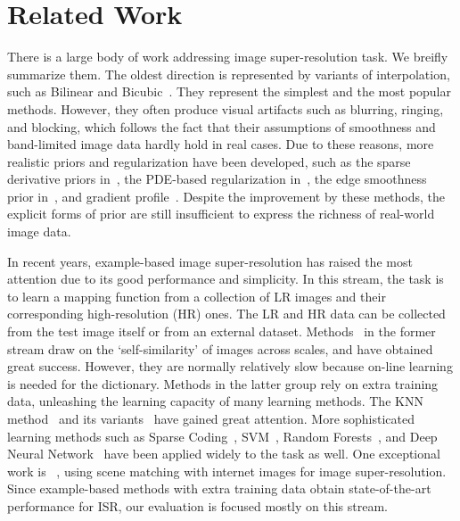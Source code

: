 \section{Related Work}
\label{sec:relatedwork}
There is a large body of work addressing image super-resolution
task. We breifly summarize them. %
The oldest direction is represented by variants of interpolation, such
as Bilinear and
Bicubic~\cite{Duchon-JAM-1979,Thevenaz-BOOK-2000}. They represent the
simplest and the most popular methods. However, they often produce
visual artifacts such as blurring, ringing, and blocking, which
follows the fact that their assumptions of smoothness and band-limited
image data hardly hold in real cases. Due to these reasons, more
realistic priors and regularization have been developed, such as the
sparse derivative priors in~\cite{Tappen-WSCTV-2003}, the PDE-based
regularization in~\cite{Tschumperle-PAMI-2005}, the edge
smoothness prior in~\cite{Dai-CVPR-2007}, and gradient profile~\cite{Sun-CVPR-2008}. Despite the improvement by
these methods, the explicit forms of prior are still insufficient to
express the richness of real-world image data.

In recent years, example-based image super-resolution has raised the
most attention due to its good performance and simplicity. In this
stream, the task is to learn a mapping function from a collection of
LR images and their corresponding high-resolution (HR) ones. The LR and HR data can be
collected from the test image itself or from an external dataset.
Methods~\cite{Freedman-TOG-2011, Glasner-ICCV-2009, selfsimaccv, Huang_2015_CVPR}
in the former stream draw on the `self-similarity' of images across scales,
and have obtained great success. However, they are normally relatively slow because on-line learning is needed for the dictionary. 
Methods in the latter group rely on extra training data, unleashing the learning capacity
of many learning methods. The KNN method~\cite{Freeman-CGA-2002}
and its variants~\cite{Chang-CVPR-2004, Yang-ICCV-2013, JOR:EG15, dai:MI}
have gained great attention. More sophisticated learning methods such as Sparse Coding~\cite{Yang-TIP-2010,  Kim-PAMI-2010, Timofte-ICCV-2013, Timofte-ACCV-2014,  deeply:improved},
SVM~\cite{ISR:SVM}, Random Forests~\cite{SR_forest, NBSRF, cSRF}, and Deep Neural Network~\cite{Dong-ECCV-2014, deep:cascade, deeply:improved} have been applied widely to the task as well.
One exceptional work is ~\cite{ISR:internet}, using scene matching with internet images for image super-resolution.
Since example-based methods with extra training data obtain state-of-the-art performance for ISR, our 
evaluation is focused mostly on this stream.

